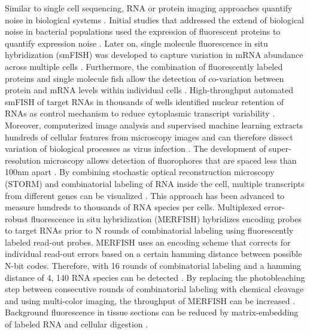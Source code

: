 Similar to single cell sequencing, RNA or protein imaging approaches quantify noise in biological systems \citep{Harton2017a}. Initial studies that addressed the extend of biological noise in bacterial populations used the expression of fluorescent proteins to quantify expression noise \citep{Elowitz2002, Blake2003}. Later on, single molecule fluorescence in situ hybridization (smFISH) was developed to capture variation in mRNA abundance across multiple cells \citep{Fang2013a, Lyubimova2013, Sanchez2013}. Furthermore, the combination of fluorescently labeled proteins and single molecule fish allow the detection of co-variation between protein and mRNA levels within individual cells \citep{Taniguchi2011}. High-throughput automated smFISH of target RNAs in thousands of wells \citep{Battich2013} identified nuclear retention of RNAs as control mechanism to reduce cytoplasmic transcript variability \citep{Battich2015a}. Moreover, computerized image analysis and supervised machine learning extracts hundreds of cellular features from microscopy images and can therefore dissect variation of biological processes as virus infection \citep{Snijder2009}.
The development of super-resolution microscopy allows detection of fluorophores that are spaced less than 100nm apart \citep{Sydor2015}. By combining stochastic optical reconstruction microscopy (STORM) and combinatorial labeling of RNA inside the cell, multiple transcripts from different genes can be visualized \citep{Lubeck2012}. This approach has been advanced to measure hundreds to thousands of RNA species per cells. Multiplexed error-robust fluorescence in situ hybridization (MERFISH) hybridizes encoding probes to target RNAs prior to N rounds of combinatorial labeling using fluorescently labeled read-out probes. MERFISH uses an encoding scheme that corrects for individual read-out errors based on a certain hamming distance between possible N-bit codes. Therefore, with 16 rounds of combinatorial labeling and a hamming distance of 4, 140 RNA species can be detected \citep{Chen2015}. By replacing the photobleaching step between consecutive rounds of combinatorial labeling with chemical cleavage and using multi-color imaging, the throughput of MERFISH can be increased \citep{Moffitt2016a}. Background fluorescence in tissue sections can be reduced by matrix-embedding of labeled RNA and cellular digestion \citep{Moffitt2016}.\\

